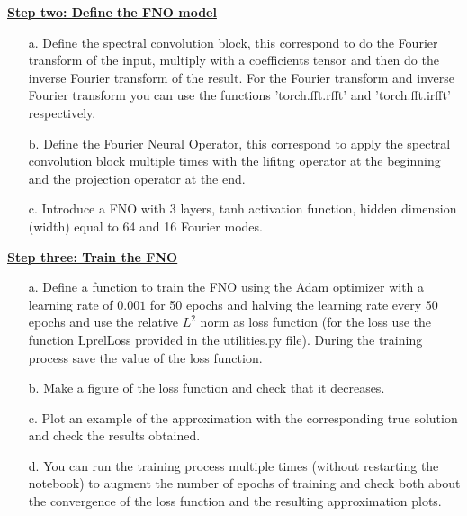 \documentclass{article}
\newcommand{\step}[1]{\underline{\textbf{\large{#1}}} }
\begin{document}
\begin{center}\step{Step two: Define the FNO model}\end{center}
\begin{itemize}
  \item[a.] Define the spectral convolution block, this correspond to do the Fourier transform of the input, multiply with a coefficients tensor and then do the inverse Fourier transform of the result. For the Fourier transform and inverse Fourier transform you can use the functions 'torch.fft.rfft' and 'torch.fft.irfft' respectively.

  \item[b.] Define the Fourier Neural Operator, this correspond to apply the spectral convolution block multiple times with the lifitng operator at the beginning and the projection operator at the end.

  \item[c.] Introduce a FNO with 3 layers, tanh activation function, hidden dimension (width) equal to 64 and 16 Fourier modes.
\end{itemize}

\newpage
\restoregeometry
\begin{center}\step{Step three: Train the FNO}\end{center}
\begin{itemize}
  \item[a.] Define a function to train the FNO using the Adam optimizer with a learning rate of $0.001$ for 50 epochs and halving the learning rate every 50 epochs and use the relative $L^2$ norm as loss function (for the loss use the function LprelLoss provided in the utilities.py file). During the training process save the value of the loss function.
  \item[b.] Make a figure of the loss function and check that it decreases.
  \item[c.] Plot an example of the approximation with the corresponding true solution and check the results obtained.
  \item[d.] You can run the training process multiple times (without restarting the notebook) to augment the number of epochs of training and check both about the convergence of the loss function and the resulting approximation plots.
\end{itemize}
\end{document}

